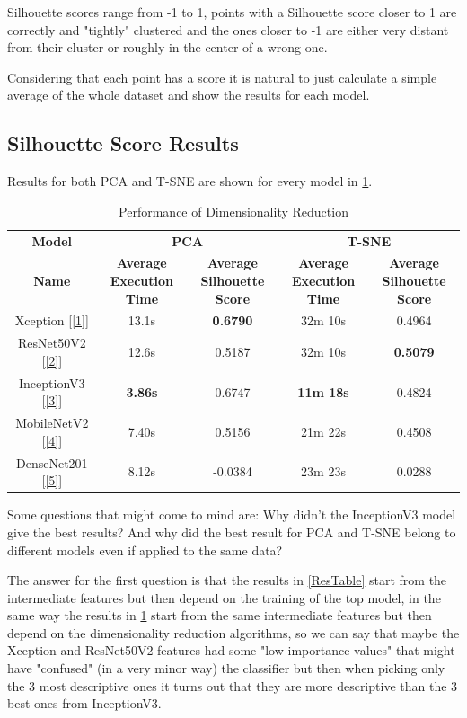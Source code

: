 \documentclass[conference]{IEEEtran}
\begin{document}
Silhouette scores range from -1 to 1, points with a Silhouette score closer to 1 are correctly and "tightly" clustered and the ones closer to -1 are either very distant from their cluster or roughly in the center of a wrong one.

Considering that each point has a score it is natural to just calculate a simple average of the whole dataset and show the results for each model.

\subsection{Silhouette Score Results}
Results for both PCA and T-SNE are shown for every model in \ref{ScoreTable}.

\begin{table}[hbpt]
\caption{Performance of Dimensionality Reduction}
\begin{center}
\begin{tabular}{|c|c|c|c|c|}
\hline
\textbf{Model} &\multicolumn{2}{|c|}{\textbf{PCA}} &\multicolumn{2}{|c|}{\textbf{T-SNE}}\\
\cline{2-5}
\textbf{Name} &\textbf{Average Execution Time} &\textbf{Average Silhouette Score} &\textbf{Average Execution Time} &\textbf{Average Silhouette Score}\\
\hline
\hline
Xception [\ref{1}] & 13.1s & \textbf{0.6790} & 32m 10s & 0.4964\\
\hline
ResNet50V2 [\ref{2}] & 12.6s & 0.5187 & 32m 10s & \textbf{0.5079}\\
\hline
InceptionV3 [\ref{3}] & \textbf{3.86s} & 0.6747 & \textbf{11m 18s} & 0.4824\\
\hline
MobileNetV2 [\ref{4}] & 7.40s & 0.5156 & 21m 22s & 0.4508\\
\hline
DenseNet201 [\ref{5}] & 8.12s & -0.0384 & 23m 23s & 0.0288\\
\hline
\end{tabular}
\label{ScoreTable}
\end{center}
\end{table}

Some questions that might come to mind are: Why didn't the InceptionV3 model give the best results? And why did the best result for PCA and T-SNE belong to different models even if applied to the same data?

The answer for the first question is that the results in \ref{ResTable} start from the intermediate features but then depend on the training of the top model,  in the same way the results in \ref{ScoreTable} start from the same intermediate features but then depend on the dimensionality reduction algorithms, so we can say that maybe the Xception and ResNet50V2 features had some "low importance values" that might have "confused" (in a very minor way) the classifier but then when picking only the 3 most descriptive ones it turns out that they are more descriptive than the 3 best ones from InceptionV3.
\end{document}
